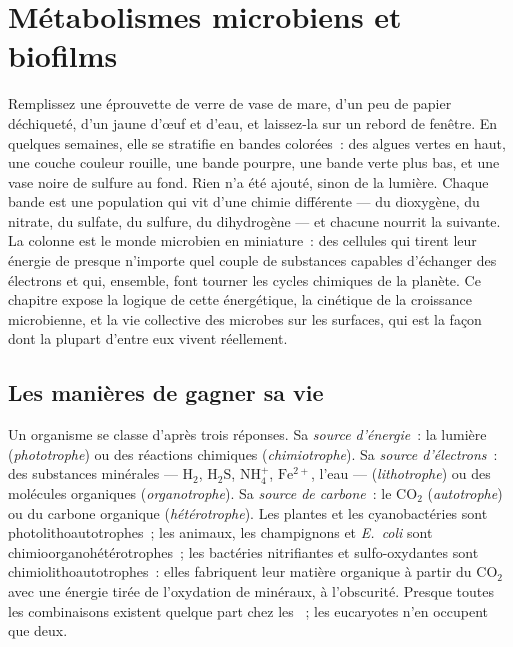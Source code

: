 \chapter{Métabolismes microbiens et biofilms}\label{ch:b2:microbial-metabolism}

Remplissez une éprouvette de verre de vase de mare, d'un peu de papier
déchiqueté, d'un jaune d'œuf et d'eau, et laissez-la sur un rebord de
fenêtre. En quelques semaines, elle se stratifie en bandes colorées~:
des algues vertes en haut, une couche couleur rouille, une bande
pourpre, une bande verte plus bas, et une vase noire de sulfure au fond.
Rien n'a été ajouté, sinon de la lumière. Chaque bande est une
population qui vit d'une chimie différente --- du dioxygène, du nitrate,
du sulfate, du sulfure, du dihydrogène --- et chacune nourrit la
suivante. La colonne est le monde microbien en miniature~: des cellules
qui tirent leur énergie de presque n'importe quel couple de substances
capables d'échanger des électrons et qui, ensemble, font tourner les
cycles chimiques de la planète. Ce chapitre expose la logique de cette
énergétique, la cinétique de la croissance microbienne, et la vie
collective des microbes sur les surfaces, qui est la façon dont la
plupart d'entre eux vivent réellement.

\section{Les manières de gagner sa vie}

\begin{definition}\label{def:b2:microbial-metabolism:trophic}
Un organisme se classe d'après trois réponses. Sa \emph{source
d'énergie}~: la lumière (\emph{phototrophe}) ou des réactions chimiques
(\emph{chimiotrophe}). Sa \emph{source d'électrons}~: des substances
minérales --- $\mathrm{H_2}$,
$\mathrm{H_2S}$, $\mathrm{NH_4^+}$, $\mathrm{Fe^{2+}}$, l'eau ---
(\emph{lithotrophe}) ou des molécules organiques (\emph{organotrophe}).
Sa \emph{source de carbone}~: le $\mathrm{CO_2}$ (\emph{autotrophe}) ou
du carbone organique (\emph{hétérotrophe}). Les plantes et les
cyanobactéries sont photolithoautotrophes~; les animaux, les champignons
et \emph{E.~coli} sont chimioorganohétérotrophes~; les bactéries
nitrifiantes et sulfo-oxydantes sont chimiolithoautotrophes~: elles
fabriquent leur matière organique à partir du
$\mathrm{CO_2}$ avec une énergie tirée de l'oxydation de minéraux, à
l'obscurité. Presque toutes les combinaisons existent quelque part chez
les ~; les eucaryotes n'en occupent que deux.
\end{definition}

